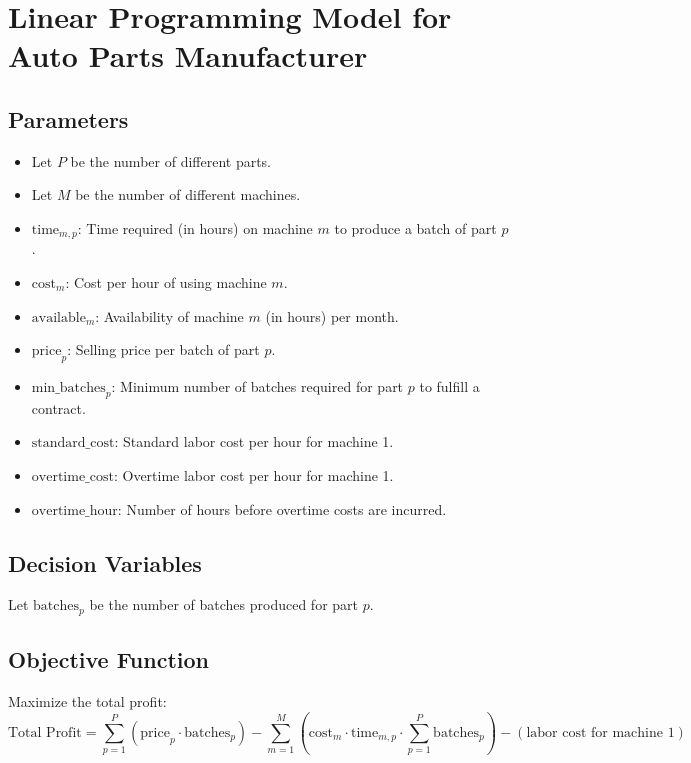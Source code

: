 \documentclass{article}
\begin{document}
\section*{Linear Programming Model for Auto Parts Manufacturer}

\subsection*{Parameters}
\begin{itemize}
    \item Let \( P \) be the number of different parts.
    \item Let \( M \) be the number of different machines.
    \item \( \text{time}_{m,p} \): Time required (in hours) on machine \( m \) to produce a batch of part \( p \).
    \item \( \text{cost}_{m} \): Cost per hour of using machine \( m \).
    \item \( \text{available}_{m} \): Availability of machine \( m \) (in hours) per month.
    \item \( \text{price}_{p} \): Selling price per batch of part \( p \).
    \item \( \text{min\_batches}_{p} \): Minimum number of batches required for part \( p \) to fulfill a contract.
    \item \( \text{standard\_cost} \): Standard labor cost per hour for machine 1.
    \item \( \text{overtime\_cost} \): Overtime labor cost per hour for machine 1.
    \item \( \text{overtime\_hour} \): Number of hours before overtime costs are incurred.
\end{itemize}

\subsection*{Decision Variables}
Let \( \text{batches}_{p} \) be the number of batches produced for part \( p \).

\subsection*{Objective Function}
Maximize the total profit:
\[
\text{Total Profit} = \sum_{p=1}^{P} \left( \text{price}_{p} \cdot \text{batches}_{p} \right) - \sum_{m=1}^{M} \left( \text{cost}_{m} \cdot \text{time}_{m,p} \cdot \sum_{p=1}^{P} \text{batches}_{p} \right) - \left( \text{labor cost for machine 1} \right)
\]
\end{document}
